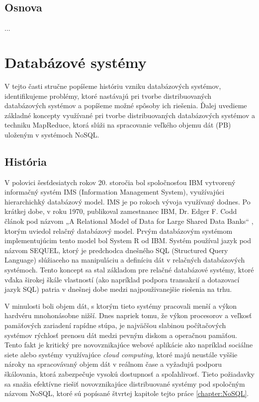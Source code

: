 \documentclass[11pt,twoside,a4paper]{book}
\begin{document}
\section*{Osnova}
...

\chapter{Databázové systémy}

V tejto časti stručne popíšeme históriu vzniku databázových systémov, identifikujeme problémy, ktoré nastávajú pri tvorbe distribuovaných databázových systémov a popíšeme možné spôsoby ich riešenia. Ďalej uvedieme základné koncepty využívané pri tvorbe distribuovaných databázových systémov a techniku MapReduce, ktorá slúži na spracovanie veľkého objemu dát (PB) uloženým v systémoch NoSQL.

\section{História}

V polovici šesťdesiatych rokov 20. storočia bol spoločnosťou IBM vytvorený informačný systém IMS (Information Management System), využívajúci hierarchichký databázový model. IMS je po rokoch vývoja využívaný dodnes. Po krátkej dobe, v roku 1970, publikoval zamestnanec IBM, Dr. Edger F. Codd článok pod názvom „A Relational Model of Data for Large Shared Data Banks“ \cite{Codd:1970:RMD:362384.362685}, ktorým uviedol relačný databázový model. Prvým databázovým systémom implementujúcim tento model bol System R od IBM. Systém používal jazyk pod názvom SEQUEL, ktorý je predchodca dnešného SQL (Structured Query Language) slúžiaceho na manipuláciu a definíciu dát v relačných databázových systémoch. Tento koncept sa stal základom pre relačné databázové systémy, ktoré vďaka širokej škále vlastností (ako napríklad podpora transakcií a dotazovací jazyk SQL) patria v dnešnej  dobe medzi najpouživanejšie riešenia na trhu.

V minulosti boli objem dát, s ktorým tieto systémy pracovali menší a výkon hardvéru mnohonásobne nižší. Dnes napriek tomu, že výkon procesorov a veľkosť pamäťových zariadení rapídne stúpa, je najväčšou slabinou počítačových systémov rýchlosť prenosu dát medzi pevným diskom a operačnou pamäťou. Tento fakt je kritický pre novovznikajúce webové aplikácie ako napríklad sociálne siete alebo systémy využívajúce \emph{cloud computing}, ktoré majú neustále vyššie nároky na spracovávaný objem dát v reálnom čase a vyžadujú podporu škálovania, ktorá zabezpečuje vysokú dostupnosť a spoľahlivosť. Tieto požiadavky sa snažia efektívne riešiť novovznikajúce distribuované systémy pod spoločným názvom NoSQL, ktoré sú popísané štvrtej kapitole tejto práce \ref{chapter:NoSQL}. 
\end{document}
